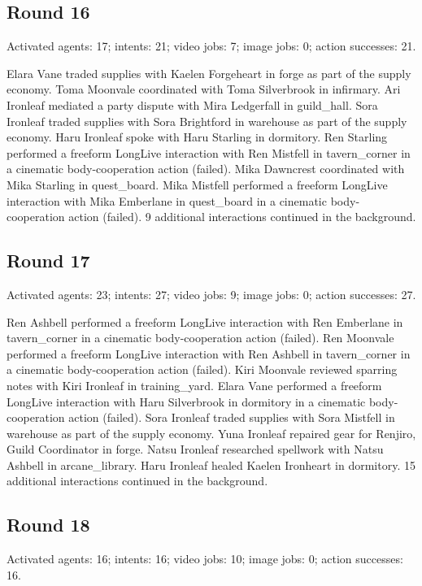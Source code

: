 \documentclass[11pt,a4paper]{article}
\begin{document}
\subsection{Round 16}
Activated agents: 17; intents: 21; video jobs: 7; image jobs: 0; action successes: 21.

Elara Vane traded supplies with Kaelen Forgeheart in forge as part of the supply economy. Toma Moonvale coordinated with Toma Silverbrook in infirmary. Ari Ironleaf mediated a party dispute with Mira Ledgerfall in guild\_hall. Sora Ironleaf traded supplies with Sora Brightford in warehouse as part of the supply economy. Haru Ironleaf spoke with Haru Starling in dormitory. Ren Starling performed a freeform LongLive interaction with Ren Mistfell in tavern\_corner in a cinematic body-cooperation action (failed). Mika Dawncrest coordinated with Mika Starling in quest\_board. Mika Mistfell performed a freeform LongLive interaction with Mika Emberlane in quest\_board in a cinematic body-cooperation action (failed). 9 additional interactions continued in the background.

\subsection{Round 17}
Activated agents: 23; intents: 27; video jobs: 9; image jobs: 0; action successes: 27.

Ren Ashbell performed a freeform LongLive interaction with Ren Emberlane in tavern\_corner in a cinematic body-cooperation action (failed). Ren Moonvale performed a freeform LongLive interaction with Ren Ashbell in tavern\_corner in a cinematic body-cooperation action (failed). Kiri Moonvale reviewed sparring notes with Kiri Ironleaf in training\_yard. Elara Vane performed a freeform LongLive interaction with Haru Silverbrook in dormitory in a cinematic body-cooperation action (failed). Sora Ironleaf traded supplies with Sora Mistfell in warehouse as part of the supply economy. Yuna Ironleaf repaired gear for Renjiro, Guild Coordinator in forge. Natsu Ironleaf researched spellwork with Natsu Ashbell in arcane\_library. Haru Ironleaf healed Kaelen Ironheart in dormitory. 15 additional interactions continued in the background.

\subsection{Round 18}
Activated agents: 16; intents: 16; video jobs: 10; image jobs: 0; action successes: 16.
\end{document}
